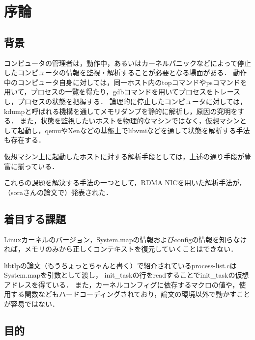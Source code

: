 \chapter{序論}
\label{chap:introduction}

\section{背景}
\label{section:background}

コンピュータの管理者は，動作中，あるいはカーネルパニックなどによって停止したコンピュータの情報を監視・解析することが必要となる場面がある．
動作中のコンピュータ自身に対しては，同一ホスト内のtopコマンドやpsコマンドを用いて，プロセスの一覧を得たり，gdbコマンドを用いてプロセスをトレースし，プロセスの状態を把握する．
論理的に停止したコンピュータに対しては，kdumpと呼ばれる機構を通してメモリダンプを静的に解析し，原因の究明をする．
また，状態を監視したいホストを物理的なマシンではなく，仮想マシンとして起動し，qemuやXenなどの基盤上でlibvmiなどを通して状態を解析する手法も存在する．

仮想マシン上に起動したホストに対する解析手段としては，上述の通り手段が豊富に揃っている．

これらの課題を解決する手法の一つとして，RDMA NICを用いた解析手法が，（soraさんの論文で）発表された．

\section{着目する課題}



Linuxカーネルのバージョン，System.mapの情報およびconfigの情報を知らなければ，メモリのみから正しくコンテキストを復元していくことはできない．

libtlpの論文（もうちょっとちゃんと書く）で紹介されているprocess-list.cはSystem.mapを引数として渡し，
init_taskの行をreadすることでinit_taskの仮想アドレスを得ている．
また，カーネルコンフィグに依存するマクロの値や，使用する関数などもハードコーディングされており，論文の環境以外で動かすことが容易ではない．

\section{目的}
\label{section:purpose}

